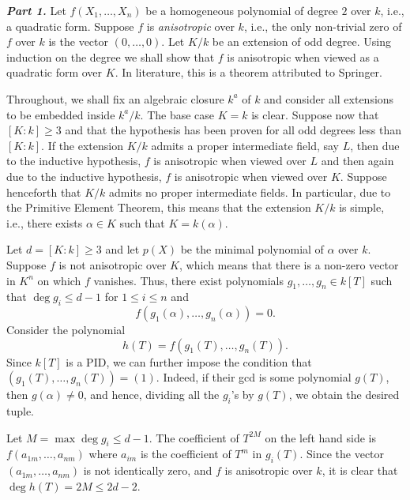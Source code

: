 \setcounter{exercise}{27}

\begin{exercise}
    \textbf{\emph{Part 1.}} Let $f(X_1,\dots,X_n)$ be a homogeneous polynomial of degree $2$ over $k$, i.e., a quadratic form. Suppose $f$ is \emph{anisotropic} over $k$, i.e., the only non-trivial zero of $f$ over $k$ is the vector $(0,\dots,0)$. Let $K/k$ be an extension of odd degree. Using induction on the degree we shall show that $f$ is anisotropic when viewed as a quadratic form over $K$. In literature, this is a theorem attributed to Springer.

    Throughout, we shall fix an algebraic closure $k^a$ of $k$ and consider all extensions to be embedded inside $k^a/k$. The base case $K = k$ is clear. Suppose now that $[K : k]\ge 3$ and that the hypothesis has been proven for all odd degrees less than $[K : k]$. If the extension $K/k$ admits a proper intermediate field, say $L$, then due to the inductive hypothesis, $f$ is anisotropic when viewed over $L$ and then again due to the inductive hypothesis, $f$ is anisotropic when viewed over $K$. Suppose henceforth that $K/k$ admits no proper intermediate fields. In particular, due to the Primitive Element Theorem, this means that the extension $K/k$ is simple, i.e., there exists $\alpha\in K$ such that $K = k(\alpha)$.

    Let $d = [K : k]\ge 3$ and let $p(X)$ be the minimal polynomial of $\alpha$ over $k$. Suppose $f$ is not anisotropic over $K$, which means that there is a non-zero vector in $K^n$ on which $f$ vanishes. Thus, there exist polynomials $g_1,\dots,g_n\in k[T]$ such that $\deg g_i\le d - 1$ for $1\le i\le n$ and 
    \begin{equation*}
        f\left(g_1(\alpha),\dots,g_n(\alpha)\right) = 0.
    \end{equation*}
    Consider the polynomial 
    \begin{equation*}
        h(T) = f\left(g_1(T),\dots,g_n(T)\right).
    \end{equation*}
    Since $k[T]$ is a PID, we can further impose the condition that $\left(g_1(T),\dots,g_n(T)\right) = (1)$. Indeed, if their gcd is some polynomial $g(T)$, then $g(\alpha)\ne 0$, and hence, dividing all the $g_i$'s by $g(T)$, we obtain the desired tuple.

    Let $M = \max\deg g_i\le d - 1$. The coefficient of $T^{2M}$ on the left hand side is $f(a_{1m},\dots,a_{nm})$ where $a_{im}$ is the coefficient of $T^m$ in $g_i(T)$. Since the vector $(a_{1m},\dots,a_{nm})$ is not identically zero, and $f$ is anisotropic over $k$, it is clear that $\deg h(T) = 2M\le 2d - 2$. 


\end{exercise}
